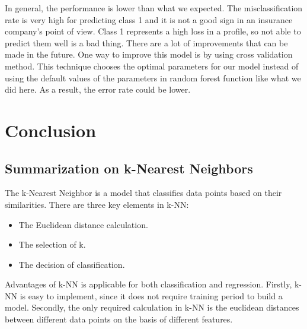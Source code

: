 \documentclass[12pt]{article} %
\theoremstyle{definition}
\begin{document}
In general, the performance is lower than what we expected. The misclassification rate is very high for predicting class 1 and it is not a good sign in an insurance company's point of view. Class 1 represents a high loss in a profile, so not able to predict them well is a bad thing. There are a lot of improvements that can be made in the future. One way to improve this model is by using cross validation method. This technique chooses the optimal parameters for our model instead of using the default values of the parameters in random forest function like what we did here. As a result, the error rate could be lower.

\newpage
\section{Conclusion}
\subsection{Summarization on k-Nearest Neighbors}
The k-Nearest Neighbor is a model that classifies data points based on their similarities. There are three key elements in k-NN:

\begin{itemize}
    \item The Euclidean distance calculation.
    \item The selection of k.
    \item The decision of classification.
\end{itemize}

Advantages of k-NN is applicable for both classification and regression. Firstly, k-NN is easy to implement, since it does not require training period to build a model. Secondly, the only required calculation in k-NN is the euclidean distances between different data points on the basis of different features.
\end{document}
